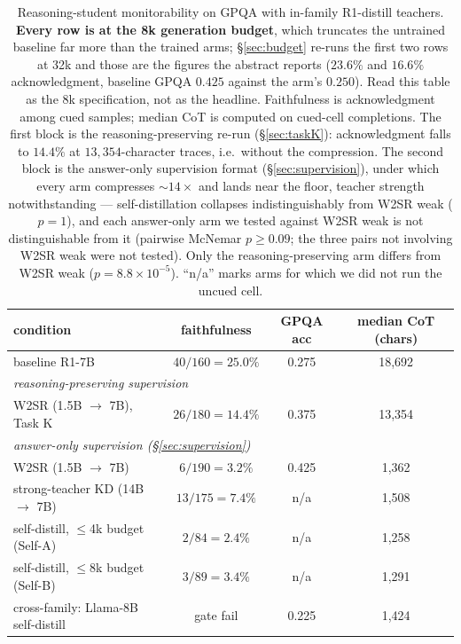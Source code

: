\documentclass{article}
\begin{document}
\begin{table}[t]
\centering\small
\caption{Reasoning-student monitorability on GPQA with in-family R1-distill
teachers. \textbf{Every row is at the 8k generation budget}, which truncates the
untrained baseline far more than the trained arms; \S\ref{sec:budget} re-runs the
first two rows at 32k and those are the figures the abstract reports
($23.6\%$ and $16.6\%$ acknowledgment, baseline GPQA $0.425$ against the arm's
$0.250$). Read this table as the 8k specification, not as the headline.
Faithfulness is acknowledgment among cued samples; median CoT is computed on
cued-cell completions. The first block is the reasoning-preserving re-run
(\S\ref{sec:taskK}): acknowledgment falls to $14.4\%$ at $13{,}354$-character
traces, i.e.\ without the compression. The
second block is the answer-only supervision format (\S\ref{sec:supervision}),
under which every arm compresses ${\sim}14\times$ and lands near the floor,
teacher strength notwithstanding --- self-distillation collapses
indistinguishably from W2SR weak ($p = 1$), and each answer-only arm we tested
against W2SR weak is not distinguishable from it (pairwise McNemar
$p \ge 0.09$; the three pairs not involving W2SR weak were not tested). Only
the reasoning-preserving arm differs from W2SR weak
($p = 8.8 \times 10^{-5}$). ``n/a'' marks arms for which we did not run the
uncued cell.}
\label{tab:r1}
\begin{tabular}{lccc}
\toprule
condition & faithfulness & GPQA acc & median CoT (chars) \\
\midrule
baseline R1-7B & $40/160 = 25.0\%$ & 0.275 & 18{,}692 \\
\midrule
\multicolumn{4}{l}{\emph{reasoning-preserving supervision}}\\
W2SR (1.5B $\to$ 7B), Task K & $26/180 = 14.4\%$ & 0.375 & 13{,}354 \\
\midrule
\multicolumn{4}{l}{\emph{answer-only supervision (\S\ref{sec:supervision})}}\\
W2SR (1.5B $\to$ 7B) & $6/190 = 3.2\%$ & 0.425 & 1{,}362 \\
strong-teacher KD (14B $\to$ 7B) & $13/175 = 7.4\%$ & n/a & 1{,}508 \\
self-distill, $\le$4k budget (Self-A) & $2/84 = 2.4\%$ & n/a & 1{,}258 \\
self-distill, $\le$8k budget (Self-B) & $3/89 = 3.4\%$ & n/a & 1{,}291 \\
\midrule
cross-family: Llama-8B self-distill & gate fail & 0.225 & 1{,}424 \\
\bottomrule

\end{tabular}
\end{table}
\end{document}

